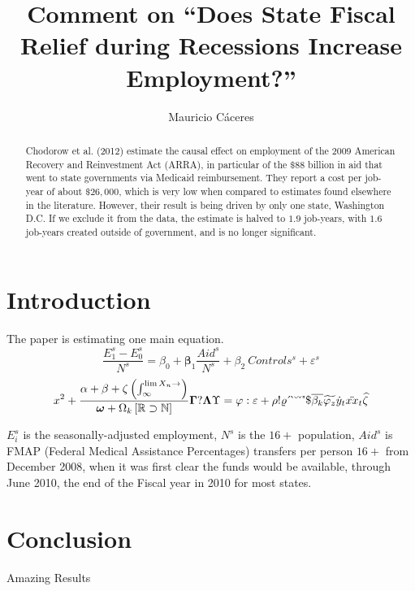 \documentclass[11pt]{article}
\title{Comment on ``Does State Fiscal Relief during Recessions Increase Employment?''}
\author{Mauricio C\'aceres}
\begin{document}
\displayoptions

\begin{abstract}
  Chodorow et al. (2012) estimate the causal effect on employment of the 2009 American Recovery and Reinvestment Act (ARRA), in particular of the $\$88$ billion in aid that went to state governments via Medicaid reimbursement. They report a cost per job-year of about $\$26,000$, which is very low when compared to estimates found elsewhere in the literature. However, their result is being driven by only one state, Washington D.C. If we exclude it from the data, the estimate is halved to $1.9$ job-years, with $1.6$ job-years created outside of government, and is no longer significant.
\end{abstract}

\section{Introduction}
\label{sec:introduction}

The paper is estimating one main equation.
\begin{equation}
  \dfrac{E_1^s - E_0^s}{N^s}
  = \beta_0 + \bm\beta_1 \dfrac{Aid^s}{N^s} + \beta_2 ~ Controls^s + \varepsilon^s
\end{equation}
\[
  x^2 + \dfrac{\alpha + \beta + \zeta \left(\int_{\infty}^{\lim X_n \to \empty}\right)}{\bm \omega + \Omega_k \left[\mathbb{R} \supset \mathbb{N}\right]}
  \bm\Gamma ? \bm\Lambda\Upsilon = \varphi : \varepsilon + \rho ! \varrho
\acute ~ \grave ~ \breve ~ \check ~ \mathring ~ \mathdollar
\overline{\beta_k} \widetilde{\varphi_z} \dot{y}_t \ddot{xx}_t \widehat{\zeta}
\]

$E_i^s$ is the seasonally-adjusted employment, $N^s$ is the $16+$ population, $Aid^s$ is FMAP (Federal Medical Assistance Percentages) transfers per person $16+$ from December 2008, when it was first clear the funds would be available, through June 2010, the end of the Fiscal year in 2010 for most states.

\section{Conclusion}
\label{sec:conclusion}

Amazing Results

\end{document}
